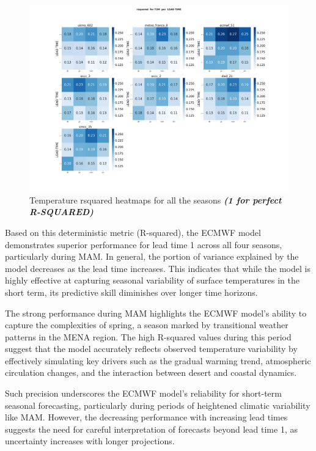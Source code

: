 \begin{figure}[H]
    \centering
    \includegraphics[width=1\linewidth]{plots/det/rsquared/rsquared_T2M_mena.png}
    \caption{Temperature rsquared heatmaps for all the seasons \textbf{\textit{(1 for perfect R-SQUARED)} }}
\end{figure}
Based on this deterministic metric (R-squared), the ECMWF model demonstrates superior performance for lead time 1 across all four seasons, particularly during MAM. In general, the portion of variance explained by the model decreases as the lead time increases. This indicates that while the model is highly effective at capturing seasonal variability of surface temperatures in the short term, its predictive skill diminishes over longer time horizons.

The strong performance during MAM highlights the ECMWF model’s ability to capture the complexities of spring, a season marked by transitional weather patterns in the MENA region. The high R-squared values during this period suggest that the model accurately reflects observed temperature variability by effectively simulating key drivers such as the gradual warming trend, atmospheric circulation changes, and the interaction between desert and coastal dynamics.

Such precision underscores the ECMWF model’s reliability for short-term seasonal forecasting, particularly during periods of heightened climatic variability like MAM. However, the decreasing performance with increasing lead times suggests the need for careful interpretation of forecasts beyond lead time 1, as uncertainty increases with longer projections.


